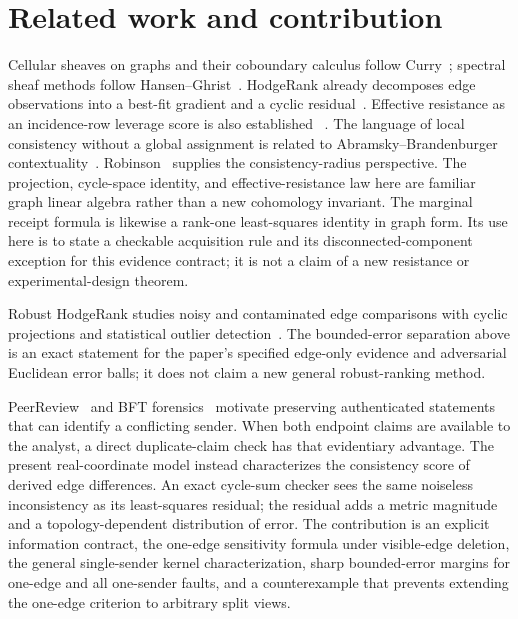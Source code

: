 \documentclass[11pt,a4paper]{article}
\begin{document}
\section{Related work and contribution}\label{sec:related}

Cellular sheaves on graphs and their coboundary calculus follow Curry~\cite{curry}; spectral sheaf methods follow
Hansen--Ghrist~\cite{hansen-ghrist}. HodgeRank already decomposes edge observations into a best-fit gradient and a
cyclic residual~\cite{hodgerank}. Effective resistance as an incidence-row leverage score is also established
~\cite{drineas-mahoney}. The language of local consistency without a global assignment is related to
Abramsky--Brandenburger contextuality~\cite{abramsky-brandenburger}. Robinson~\cite{robinson} supplies the
consistency-radius perspective. The projection, cycle-space identity, and effective-resistance law here are familiar
graph linear algebra rather than a new cohomology invariant.
The marginal receipt formula is likewise a rank-one least-squares identity in graph form. Its use here is to
state a checkable acquisition rule and its disconnected-component exception for this evidence contract; it is
not a claim of a new resistance or experimental-design theorem.

Robust HodgeRank studies noisy and contaminated edge comparisons with cyclic projections and statistical outlier
detection~\cite{robust-hodgerank}. The bounded-error separation above is an exact statement for the paper's specified
edge-only evidence and adversarial Euclidean error balls; it does not claim a new general robust-ranking method.

PeerReview~\cite{peerreview} and BFT forensics~\cite{sheng} motivate preserving authenticated statements that can identify a conflicting sender. When both endpoint claims are available to the analyst, a direct duplicate-claim check has that evidentiary advantage. The present real-coordinate model instead characterizes the consistency score of derived edge differences. An exact cycle-sum checker sees the same noiseless inconsistency as its least-squares residual; the residual adds a metric magnitude and a topology-dependent distribution of error. The contribution is an explicit information contract, the one-edge sensitivity formula under visible-edge deletion, the general single-sender kernel characterization, sharp bounded-error margins for one-edge and all one-sender faults, and a counterexample that prevents extending the one-edge criterion to arbitrary split views.
\end{document}
